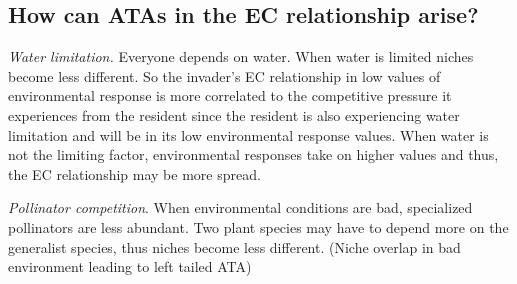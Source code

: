 \documentclass[letterpaper,11pt]{article}
\begin{document}
\subsection{How can ATAs in the EC relationship arise?}
\emph{Water limitation.} Everyone depends on water. When water is limited niches become less different. So the invader's EC relationship in low values of environmental response is more correlated to the competitive pressure it experiences from the resident since the resident is also experiencing water limitation and will be in its low environmental response values. When water is not the limiting factor, environmental responses take on higher values and thus, the EC relationship may be more spread. 

\emph{Pollinator competition}. When environmental conditions are bad, specialized pollinators are less abundant. Two plant species may have to depend more on the generalist species, thus niches become less different.  (Niche overlap in bad environment leading to left tailed ATA)
\end{document}
